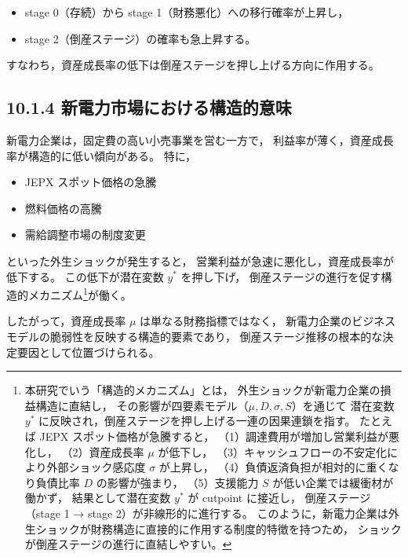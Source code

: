\begin{itemize}
    \item stage 0（存続）から stage 1（財務悪化）への移行確率が上昇し，
    \item stage 2（倒産ステージ）の確率も急上昇する。
\end{itemize}

すなわち，資産成長率の低下は倒産ステージを押し上げる方向に作用する。

\subsection*{10.1.4 新電力市場における構造的意味}

新電力企業は，固定費の高い小売事業を営む一方で，
利益率が薄く，資産成長率が構造的に低い傾向がある。
特に，

\begin{itemize}
    \item JEPX スポット価格の急騰
    \item 燃料価格の高騰
    \item 需給調整市場の制度変更
\end{itemize}

といった外生ショックが発生すると，
営業利益が急速に悪化し，資産成長率が低下する。
この低下が潜在変数 $y^*$ を押し下げ，
倒産ステージの進行を促す構造的メカニズム\footnote{
本研究でいう「構造的メカニズム」とは，
外生ショックが新電力企業の損益構造に直結し，
その影響が四要素モデル（$\mu, D, \sigma, S$）を通じて
潜在変数 $y^*$ に反映され，倒産ステージを押し上げる一連の因果連鎖を指す。
たとえば JEPX スポット価格が急騰すると，
（1）調達費用が増加し営業利益が悪化し，
（2）資産成長率 $\mu$ が低下し，
（3）キャッシュフローの不安定化により外部ショック感応度 $\sigma$ が上昇し，
（4）負債返済負担が相対的に重くなり負債比率 $D$ の影響が強まり，
（5）支援能力 $S$ が低い企業では緩衝材が働かず，
結果として潜在変数 $y^*$ が cutpoint に接近し，
倒産ステージ（stage 1 → stage 2）が非線形的に進行する。
このように，新電力企業は外生ショックが財務構造に直接的に作用する制度的特徴を持つため，
ショックが倒産ステージの進行に直結しやすい。}が働く。

したがって，資産成長率 $\mu$ は単なる財務指標ではなく，
新電力企業のビジネスモデルの脆弱性を反映する構造的要素であり，
倒産ステージ推移の根本的な決定要因として位置づけられる。



